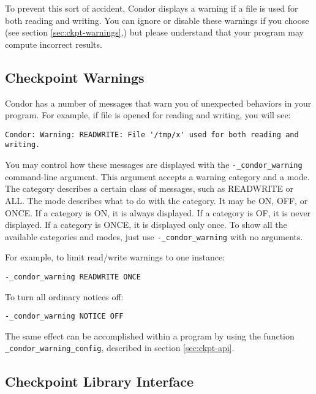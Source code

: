 To prevent this sort of accident, Condor displays a warning
if a file is used for both reading and writing.  You can ignore or disable
these warnings if you choose (see section \ref{sec:ckpt-warnings},) but
please understand that your program may compute incorrect results.

\subsection{\label{sec:ckpt-warnings}Checkpoint Warnings}

Condor has a number of messages that warn you of unexpected
behaviors in your program.  For example, if file 
is opened for reading
and writing, you will see:

\begin{verbatim}
Condor: Warning: READWRITE: File '/tmp/x' used for both reading and writing.
\end{verbatim}

You may control how these messages are displayed with the
\verb$-_condor_warning$ command-line argument.  This argument
accepts a warning category and a mode.  The category describes a certain
class of messages, such as READWRITE or ALL.  The mode describes what
to do with the category.  It may be ON, OFF, or ONCE.
If a category is ON, it is always displayed.
If a category is OF, it is never displayed.
If a category is ONCE, it is displayed only once.
To show all the available categories and modes, just use
\verb$-_condor_warning$ with no arguments.

For example, to limit read/write warnings to one instance:

\begin{verbatim}
-_condor_warning READWRITE ONCE
\end{verbatim}

To turn all ordinary notices off:

\begin{verbatim}
-_condor_warning NOTICE OFF
\end{verbatim}

The same effect can be accomplished within a program by using the function
\verb$_condor_warning_config$, described in section \ref{sec:ckpt-api}.

\subsection{\label{sec:ckpt-api}Checkpoint Library Interface}

